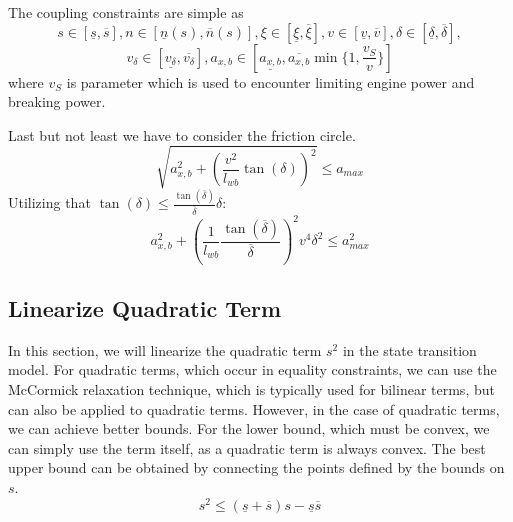 The coupling constraints are simple as \[ s\in[\underline{s}, \overline{s}], n\in[\underline{n}(s), \overline{n}(s)], \xi \in [\underline{\xi},
		\overline{\xi}], v\in[\underline{v}, \overline{v}], \delta \in [\underline{\delta}, \overline{\delta}], \] \[ v_\delta \in [\underline{v_\delta},
		\overline{v_\delta}], a_{x,b} \in [\underline{a_{x,b}}, \overline{a_{x,b}}\min\{1, \frac{v_S}{v}\}] \] where $v_S$ is parameter which is used to
encounter limiting engine power and breaking power.

Last but not least we have to consider the friction circle.
\[
	\sqrt{a_{x,b}^2 + (\frac{v^2}{l_{wb}} \tan(\delta))^2} \leq a_{max}
\]
Utilizing that $\tan(\delta) \leq \frac{\tan(\overline{\delta})}{\overline{\delta}}\delta$:
\[
	a_{x,b}^2 + (\frac{1}{l_{wb}}\frac{\tan(\overline{\delta})}{\overline{\delta}})^2 v^4 \delta^2 \leq a_{max}^2
\]

\subsection{Linearize Quadratic Term}

In this section, we will linearize the quadratic term \(s^2\) in the state transition model.
For quadratic terms, which occur in equality constraints, we can use the McCormick relaxation technique, which is typically used for bilinear terms,
but can also be applied to quadratic terms.
However, in the case of quadratic terms, we can achieve better bounds.
For the lower bound, which must be convex, we can simply use the term itself, as a quadratic term is always convex.
The best upper bound can be obtained by connecting the points defined by the bounds on \(s\).
\[
	s^2 \leq (\underline{s} + \overline{s})s - \underline{s}\overline{s}
\]